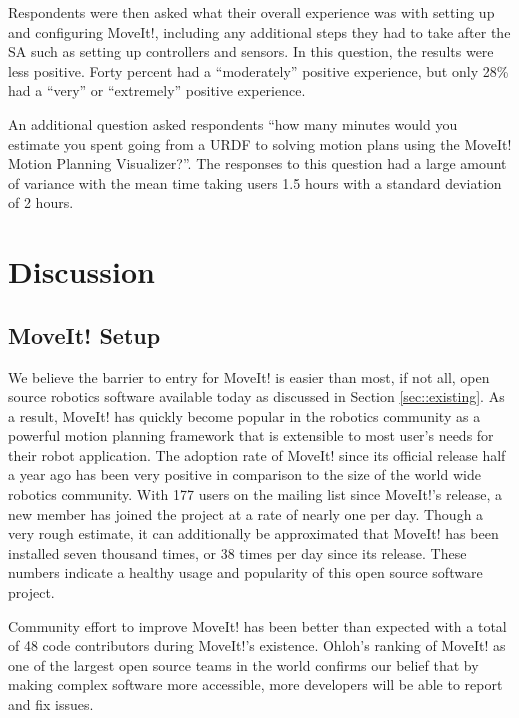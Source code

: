 \documentclass[10pt,journal,compsoc]{joser1}
\begin{document}
{Respondents were then asked what their overall experience was with setting up and configuring MoveIt!, including any additional steps they had to take after the SA such as setting up controllers and sensors. In this question, the results were less positive. Forty percent had a ``moderately'' positive experience, but only 28\% had a ``very'' or ``extremely'' positive experience. 

An additional question asked respondents ``how many minutes would you estimate you spent going from a URDF to solving motion plans using the MoveIt! Motion Planning Visualizer?''. The responses to this question had a large amount of variance with the mean time taking users 1.5 hours with a standard deviation of 2 hours.



\section{Discussion}
\label{sec::discussion}

\subsection{MoveIt! Setup}
\label{sec::moveit_discussion}

We believe the barrier to entry for MoveIt! is easier than most, if not all, open source robotics software available today as discussed in Section \ref{sec::existing}. As a result, MoveIt! has quickly become popular in the robotics community as a powerful motion planning framework that is extensible to most user's needs for their robot application. The adoption rate of MoveIt! since its official release half a year ago has been very positive in comparison to the size of the world wide robotics community. With 177 users on the mailing list since MoveIt!'s release, a new member has joined the project at a rate of nearly one per day. Though a very rough estimate, it can additionally be approximated that MoveIt! has been installed seven thousand times, or 38 times per day since its release. These numbers indicate a healthy usage and popularity of this open source software project.

Community effort to improve MoveIt! has been better than expected with a total of 48 code contributors during MoveIt!'s existence. Ohloh's ranking of MoveIt! as one of the largest open source teams in the world confirms our belief that by making complex software more accessible, more developers will be able to report and fix issues. 

}
\end{document}
